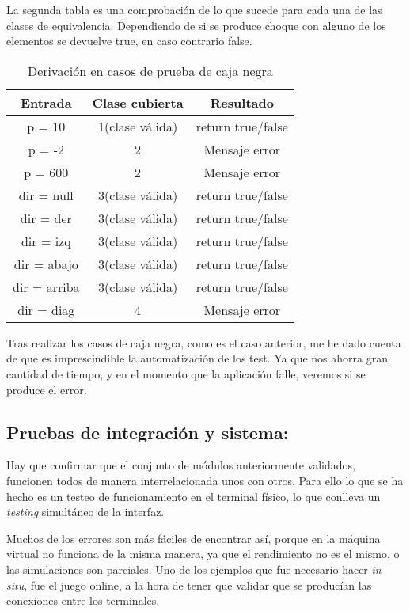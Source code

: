 La segunda tabla es una comprobación de lo que sucede para cada una de las clases de equivalencia. Dependiendo de si se produce choque con alguno de los elementos se devuelve true, en caso contrario false.
\begin{table}[H]
	\begin{center}
		\begin{tabular}{ccc}
			\hline
			Entrada		& Clase cubierta		& Resultado \\ \hline
			p =	10		&1(clase válida)		&return true/false\\
			p =	-2		&2						&Mensaje error\\
			p =	600		&2						&Mensaje error\\
			dir = null  &3(clase válida)		&return true/false\\
			dir = der   &3(clase válida)		&return true/false\\
			dir = izq   &3(clase válida)		&return true/false\\
			dir = abajo &3(clase válida)		&return true/false\\
			dir = arriba&3(clase válida)		&return true/false\\
			dir = diag	&4						&Mensaje error\\
		\end{tabular}
		\caption{Derivación en casos de prueba de caja negra}
		\label{table:derivacion}
	\end{center}
\end{table}

Tras realizar los casos de caja negra, como es el caso anterior, me he dado cuenta de que es imprescindible la automatización de los test. Ya que nos ahorra gran cantidad de tiempo, y en el momento que la aplicación falle, veremos si se produce el error.

\subsection{Pruebas de integración y sistema:}
Hay que confirmar que el conjunto de módulos anteriormente validados, funcionen todos de manera interrelacionada unos con otros. Para ello lo que se ha hecho es un testeo de funcionamiento en el terminal físico, lo que conlleva un \emph{testing} simultáneo de la interfaz. 

Muchos de los errores son más fáciles de encontrar así, porque en la máquina virtual no funciona de la misma manera, ya que el rendimiento no es el mismo, o las simulaciones son parciales. Uno de los ejemplos que fue necesario hacer \emph{in situ}, fue el juego online, a la hora de tener que validar que se producían las conexiones entre los terminales.

